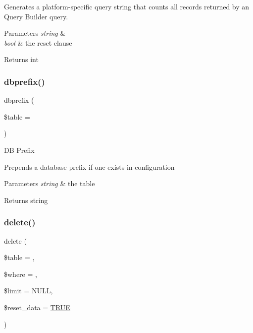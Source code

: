 Generates a platform-\/specific query string that counts all records returned by an Query Builder query.


\begin{DoxyParams}{Parameters}
{\em string} & \\
\hline
{\em bool} & the reset clause \\
\hline
\end{DoxyParams}
\begin{DoxyReturn}{Returns}
int 
\end{DoxyReturn}
\mbox{\label{class_c_i___d_b__query__builder_a98b692562f4990d04d161d0408061ed8}} 
\subsubsection{\texorpdfstring{dbprefix()}{dbprefix()}}
{\footnotesize\ttfamily dbprefix (\begin{DoxyParamCaption}\item[{}]{\$table = {\ttfamily \textquotesingle{}\textquotesingle{}} }\end{DoxyParamCaption})}

DB Prefix

Prepends a database prefix if one exists in configuration


\begin{DoxyParams}{Parameters}
{\em string} & the table \\
\hline
\end{DoxyParams}
\begin{DoxyReturn}{Returns}
string 
\end{DoxyReturn}
\mbox{\label{class_c_i___d_b__query__builder_a482722b9989c53ed8ecd68b22df64507}} 
\subsubsection{\texorpdfstring{delete()}{delete()}}
{\footnotesize\ttfamily delete (\begin{DoxyParamCaption}\item[{}]{\$table = {\ttfamily \textquotesingle{}\textquotesingle{}},  }\item[{}]{\$where = {\ttfamily \textquotesingle{}\textquotesingle{}},  }\item[{}]{\$limit = {\ttfamily NULL},  }\item[{}]{\$reset\+\_\+data = {\ttfamily \mbox{\hyperlink{constants_8php_ae04a3efe6aa42044f803ee90c2277846}{T\+R\+UE}}} }\end{DoxyParamCaption})}

